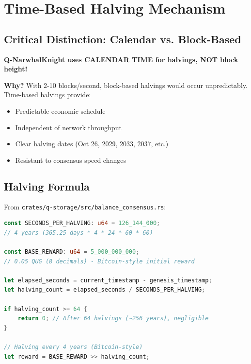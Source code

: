 \documentclass[11pt,a4paper]{article}
\begin{document}
\section{Time-Based Halving Mechanism}

\subsection{Critical Distinction: Calendar vs. Block-Based}

\begin{tcolorbox}[colback=accentcolor!20, colframe=accentcolor, title={\Large TIME-BASED HALVING (Not Block-Based!)}]
\textbf{Q-NarwhalKnight uses CALENDAR TIME for halvings, NOT block height!}

\textbf{Why?} With 2-10 blocks/second, block-based halvings would occur unpredictably. Time-based halvings provide:
\begin{itemize}
    \item Predictable economic schedule
    \item Independent of network throughput
    \item Clear halving dates (Oct 26, 2029, 2033, 2037, etc.)
    \item Resistant to consensus speed changes
\end{itemize}
\end{tcolorbox}

\subsection{Halving Formula}

From \texttt{crates/q-storage/src/balance\_consensus.rs}:

\begin{lstlisting}[language=Rust, caption=Time-based halving implementation]
const SECONDS_PER_HALVING: u64 = 126_144_000;
// 4 years (365.25 days * 4 * 24 * 60 * 60)

const BASE_REWARD: u64 = 5_000_000_000;
// 0.05 QUG (8 decimals) - Bitcoin-style initial reward

let elapsed_seconds = current_timestamp - genesis_timestamp;
let halving_count = elapsed_seconds / SECONDS_PER_HALVING;

if halving_count >= 64 {
    return 0; // After 64 halvings (~256 years), negligible
}

// Halving every 4 years (Bitcoin-style)
let reward = BASE_REWARD >> halving_count;
\end{lstlisting}
\end{document}
